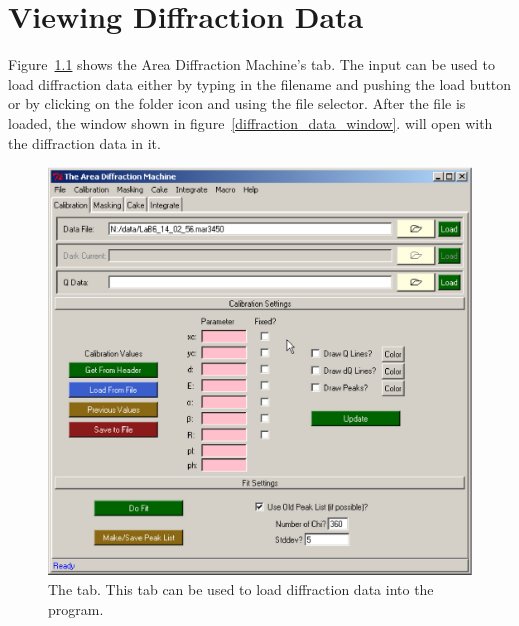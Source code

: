 \chapter{Viewing Diffraction Data}\label{viewing_data}

Figure~\ref{calibration_tab} shows the 
Area Diffraction Machine's  tab. 
The  input can be 
used to load diffraction data either by typing in the filename 
and pushing the load button or by clicking on the folder icon and
using the file selector. After the file is loaded, 
the window shown in figure~\ref{diffraction_data_window}.
will open with the diffraction data in it. 

\begin{figure}
    \centering
    \includegraphics[scale=.75]
    {figures/calibration_tab.eps}
    \caption{The  tab. This tab can be used
    to load diffraction data into the program.} 
    \label{calibration_tab}
\end{figure}

